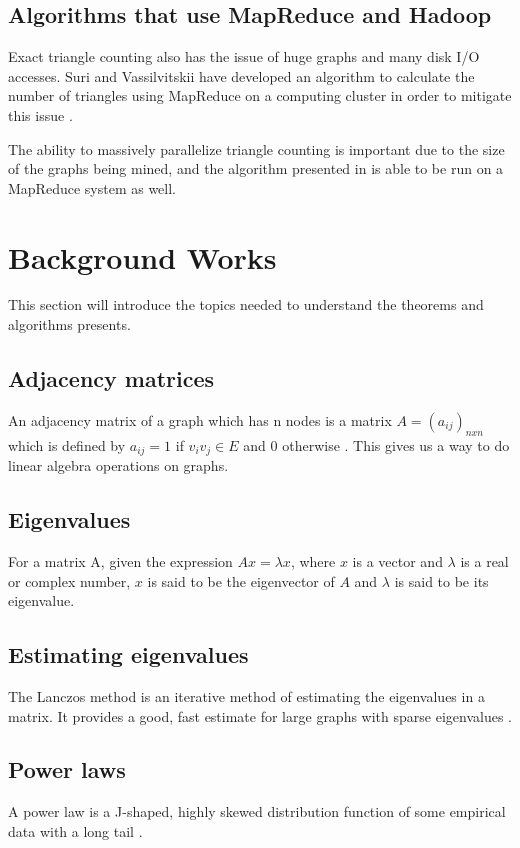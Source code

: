 \documentclass{acm_proc_article-sp}
\begin{document}
\subsection{Algorithms that use MapReduce and Hadoop}
Exact triangle counting also has the issue of huge graphs and many disk I/O
accesses. Suri and Vassilvitskii have developed an algorithm to calculate the
number of triangles using MapReduce on a computing cluster in order to mitigate
this issue \cite{suri}.

The ability to massively parallelize triangle counting is important due to the
size of the graphs being mined, and the algorithm presented in \cite{original} 
is able to be run on a MapReduce system as well.

\section{Background Works}
This section will introduce the topics needed to understand the theorems and
algorithms \cite{original} presents.

\subsection{Adjacency matrices}
An adjacency matrix of a graph which has n nodes is a matrix $A = 
(a_{ij})_{nxn}$ which is defined by $a_{ij} = 1$ if $v_iv_j \in E$ and $0$
otherwise
\cite{diestel}.  This gives us a way to do linear algebra operations on graphs.

\subsection{Eigenvalues}
For a matrix A, given the expression $Ax = \lambda x$, where $x$ is a vector and
$\lambda$ is a real or complex number, $x$ is said to be the eigenvector of $A$
and $\lambda$ is said to be its eigenvalue. \cite{lovasz}

\subsection{Estimating eigenvalues}
The Lanczos method is an iterative method of estimating the eigenvalues in a
matrix. It provides a good, fast estimate for large graphs with sparse
eigenvalues \cite{golub}.

\subsection{Power laws}
A power law is a J-shaped, highly skewed distribution function of some
empirical data with a long tail \cite{simon}.
\end{document}
